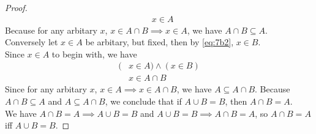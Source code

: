 \documentclass[12pt]{article}
\begin{document}
\begin{proof}
\begin{align*}
            &x \in A
        \end{align*}
    Because for any arbitary $x$,
        $x \in A \cap B \implies x \in A$, we have $A \cap B \subseteq A$.\\
    Conversely let $x \in A$ be arbitary, but fixed, then by \eqref{eq:7b2}, $x \in B$.\\
    Since $x \in A$ to begin with, we have
        \begin{align*}
            (&x \in A) \land (x \in B)\\
            &x \in A \cap B
        \end{align*}
    Since for any arbitary $x$,
        $x \in A \implies x \in A \cap B$, we have $A \subseteq A \cap B$.
    Because $A \cap B \subseteq A$ and $A \subseteq A \cap B$, we conclude that
        if $A \cup B = B$, then $A \cap B = A$.\\
    We have $A \cap B = A \implies A \cup B = B$ and $A \cup B = B \implies A \cap B = A$,
    so $A \cap B = A$ iff $A \cup B = B$.
\end{proof}
\newpage
\end{document}
